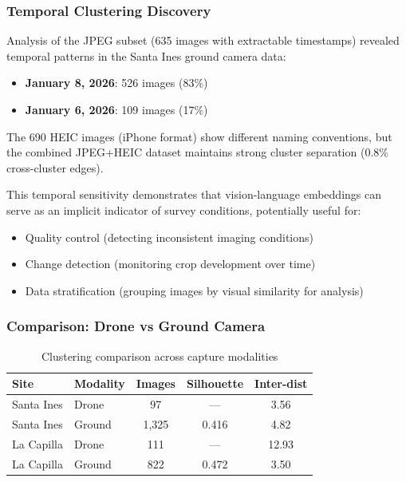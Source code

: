 
\subsubsection{Temporal Clustering Discovery}

Analysis of the JPEG subset (635 images with extractable timestamps) revealed temporal patterns in the Santa Ines ground camera data:

\begin{itemize}
    \item \textbf{January 8, 2026}: 526 images (83\%)
    \item \textbf{January 6, 2026}: 109 images (17\%)
\end{itemize}

The 690 HEIC images (iPhone format) show different naming conventions, but the combined JPEG+HEIC dataset maintains strong cluster separation (0.8\% cross-cluster edges).


This temporal sensitivity demonstrates that vision-language embeddings can serve as an implicit indicator of survey conditions, potentially useful for:
\begin{itemize}
    \item Quality control (detecting inconsistent imaging conditions)
    \item Change detection (monitoring crop development over time)
    \item Data stratification (grouping images by visual similarity for analysis)
\end{itemize}

\subsubsection{Comparison: Drone vs Ground Camera}

\begin{table}[H]
\centering
\caption{Clustering comparison across capture modalities}
\label{tab:modality_comparison}
\begin{tabular}{llccc}
\toprule
\textbf{Site} & \textbf{Modality} & \textbf{Images} & \textbf{Silhouette} & \textbf{Inter-dist} \\
\midrule
Santa Ines & Drone & 97 & --- & 3.56 \\
Santa Ines & Ground & 1,325 & 0.416 & 4.82 \\
La Capilla & Drone & 111 & --- & 12.93 \\
La Capilla & Ground & 822 & 0.472 & 3.50 \\
\bottomrule
\end{tabular}
\end{table}

